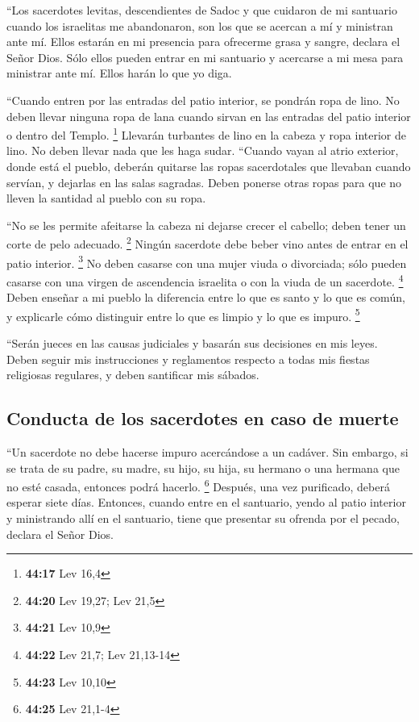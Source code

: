  ``Los sacerdotes levitas, descendientes de Sadoc y que
cuidaron de mi santuario cuando los israelitas me abandonaron, son los
que se acercan a mí y ministran ante mí. Ellos estarán en mi presencia
para ofrecerme grasa y sangre, declara el Señor Dios. 
Sólo ellos pueden entrar en mi santuario y acercarse a mi mesa para
ministrar ante mí. Ellos harán lo que yo diga.

 ``Cuando entren por las entradas del patio interior, se
pondrán ropa de lino. No deben llevar ninguna ropa de lana cuando sirvan
en las entradas del patio interior o dentro del Templo. \footnote{\textbf{44:17}
  Lev 16,4}  Llevarán turbantes de lino en la cabeza y
ropa interior de lino. No deben llevar nada que les haga sudar.
 ``Cuando vayan al atrio exterior, donde está el pueblo,
deberán quitarse las ropas sacerdotales que llevaban cuando servían, y
dejarlas en las salas sagradas. Deben ponerse otras ropas para que no
lleven la santidad al pueblo con su ropa.

 ``No se les permite afeitarse la cabeza ni dejarse
crecer el cabello; deben tener un corte de pelo adecuado. \footnote{\textbf{44:20}
  Lev 19,27; Lev 21,5}  Ningún sacerdote debe beber vino
antes de entrar en el patio interior. \footnote{\textbf{44:21} Lev 10,9}
 No deben casarse con una mujer viuda o divorciada; sólo
pueden casarse con una virgen de ascendencia israelita o con la viuda de
un sacerdote. \footnote{\textbf{44:22} Lev 21,7; Lev 21,13-14}
 Deben enseñar a mi pueblo la diferencia entre lo que es
santo y lo que es común, y explicarle cómo distinguir entre lo que es
limpio y lo que es impuro. \footnote{\textbf{44:23} Lev 10,10}

 ``Serán jueces en las causas judiciales y basarán sus
decisiones en mis leyes. Deben seguir mis instrucciones y reglamentos
respecto a todas mis fiestas religiosas regulares, y deben santificar
mis sábados.

\hypertarget{conducta-de-los-sacerdotes-en-caso-de-muerte}{%
\subsection{Conducta de los sacerdotes en caso de
muerte}\label{conducta-de-los-sacerdotes-en-caso-de-muerte}}

 ``Un sacerdote no debe hacerse impuro acercándose a un
cadáver. Sin embargo, si se trata de su padre, su madre, su hijo, su
hija, su hermano o una hermana que no esté casada, entonces podrá
hacerlo. \footnote{\textbf{44:25} Lev 21,1-4}  Después,
una vez purificado, deberá esperar siete días.  Entonces,
cuando entre en el santuario, yendo al patio interior y ministrando allí
en el santuario, tiene que presentar su ofrenda por el pecado, declara
el Señor Dios.

